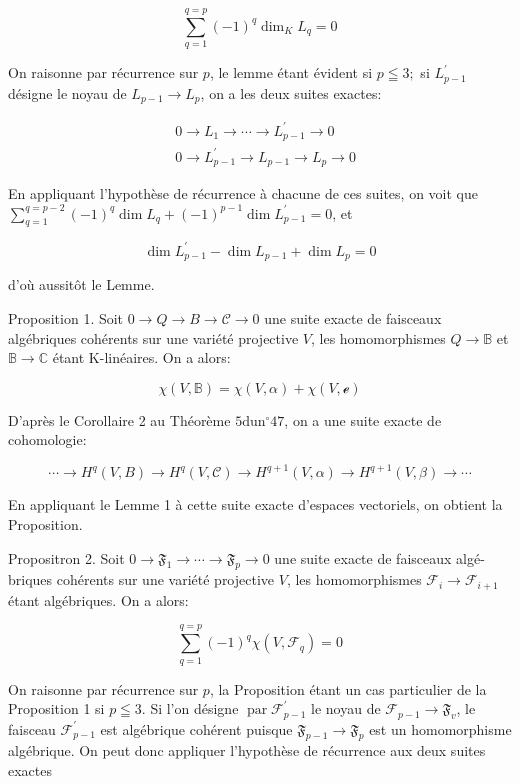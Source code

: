 $$
\sum_{q=1}^{q=p}(-1)^{q} \operatorname{dim}_{K} L_{q}=0
$$

On raisonne par récurrence sur $p$, le lemme étant évident si $p \leqq 3 ;$ si $L_{p-1}^{\prime}$ désigne le noyau de $L_{p-1} \rightarrow L_{p}$, on a les deux suites exactes:

$$
\begin{aligned}
    &0 \rightarrow L_{1} \rightarrow \cdots \rightarrow L_{p-1}^{\prime} \rightarrow 0 \\
    &0 \rightarrow L_{p-1}^{\prime} \rightarrow L_{p-1} \rightarrow L_{p} \rightarrow 0
\end{aligned}
$$

En appliquant l'hypothèse de récurrence à chacune de ces suites, on voit que $\sum_{q=1}^{q=p-2}(-1)^{q} \operatorname{dim} L_{q}+(-1)^{p-1} \operatorname{dim} L_{p-1}^{\prime}=0$, et

$$
\operatorname{dim} L_{p-1}^{\prime}-\operatorname{dim} L_{p-1}+\operatorname{dim} L_{p}=0
$$

d'où aussitôt le Lemme.

Proposition 1. Soit $0 \rightarrow Q \rightarrow B \rightarrow \mathcal{C} \rightarrow 0$ une suite exacte de faisceaux algébriques cohérents sur une variété projective $V$, les homomorphismes $Q \rightarrow \mathbb{B}$ et $\mathbb{B} \rightarrow \mathbb{C}$ étant K-linéaires. On a alors:

$$
\chi(V, \mathbb{B})=\chi(V, \alpha)+\chi(V, \mathcal{e})
$$

D'après le Corollaire 2 au Théorème $5 \mathrm{du} \mathrm{n}^{\circ} 47$, on a une suite exacte de cohomologie:

$$
\cdots \rightarrow H^{q}(V, B) \rightarrow H^{q}(V, \mathcal{C}) \rightarrow H^{q+1}(V, \alpha) \rightarrow H^{q+1}(V, \beta) \rightarrow \cdots
$$

En appliquant le Lemme 1 à cette suite exacte d'espaces vectoriels, on obtient la Proposition.

Propositron 2. Soit $0 \rightarrow \mathfrak{F}_{1} \rightarrow \cdots \rightarrow \mathfrak{F}_{p} \rightarrow 0$ une suite exacte de faisceaux algé- briques cohérents sur une variété projective $V$, les homomorphismes $\mathcal{F}_{i} \rightarrow \mathcal{F}_{i+1}$ étant algébriques. On a alors:

$$
\sum_{q=1}^{q=p}(-1)^{q} \chi\left(V, \mathcal{F}_{q}\right)=0
$$

On raisonne par récurrence sur $p$, la Proposition étant un cas particulier de la Proposition 1 si $p \leqq 3$. Si l'on désigne $\operatorname{par} \mathscr{F}_{p-1}^{\prime}$ le noyau de $\mathcal{F}_{p-1} \rightarrow \mathfrak{F}_{v}$, le faisceau $\mathcal{F}_{p-1}^{\prime}$ est algébrique cohérent puisque $\mathfrak{F}_{p-1} \rightarrow \mathfrak{F}_{p}$ est un homomorphisme algébrique. On peut donc appliquer l'hypothèse de récurrence aux deux suites exactes

